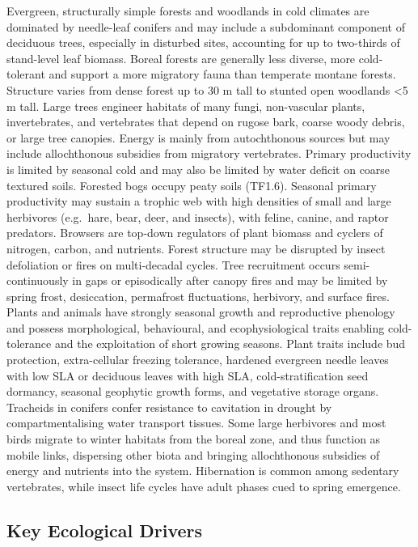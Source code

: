 \documentclass[
  letterpaper,
  DIV=11,
  numbers=noendperiod]{scrartcl}
\begin{document}
Evergreen, structurally simple forests and woodlands in cold climates
are dominated by needle-leaf conifers and may include a subdominant
component of deciduous trees, especially in disturbed sites, accounting
for up to two-thirds of stand-level leaf biomass. Boreal forests are
generally less diverse, more cold-tolerant and support a more migratory
fauna than temperate montane forests. Structure varies from dense forest
up to 30 m tall to stunted open woodlands \textless5 m tall. Large trees
engineer habitats of many fungi, non-vascular plants, invertebrates, and
vertebrates that depend on rugose bark, coarse woody debris, or large
tree canopies. Energy is mainly from autochthonous sources but may
include allochthonous subsidies from migratory vertebrates. Primary
productivity is limited by seasonal cold and may also be limited by
water deficit on coarse textured soils. Forested bogs occupy peaty soils
(TF1.6). Seasonal primary productivity may sustain a trophic web with
high densities of small and large herbivores (e.g.~hare, bear, deer, and
insects), with feline, canine, and raptor predators. Browsers are
top-down regulators of plant biomass and cyclers of nitrogen, carbon,
and nutrients. Forest structure may be disrupted by insect defoliation
or fires on multi-decadal cycles. Tree recruitment occurs
semi-continuously in gaps or episodically after canopy fires and may be
limited by spring frost, desiccation, permafrost fluctuations,
herbivory, and surface fires. Plants and animals have strongly seasonal
growth and reproductive phenology and possess morphological,
behavioural, and ecophysiological traits enabling cold-tolerance and the
exploitation of short growing seasons. Plant traits include bud
protection, extra-cellular freezing tolerance, hardened evergreen needle
leaves with low SLA or deciduous leaves with high SLA,
cold-stratification seed dormancy, seasonal geophytic growth forms, and
vegetative storage organs. Tracheids in conifers confer resistance to
cavitation in drought by compartmentalising water transport tissues.
Some large herbivores and most birds migrate to winter habitats from the
boreal zone, and thus function as mobile links, dispersing other biota
and bringing allochthonous subsidies of energy and nutrients into the
system. Hibernation is common among sedentary vertebrates, while insect
life cycles have adult phases cued to spring emergence.

\subsection{Key Ecological Drivers}\label{key-ecological-drivers-73}
\end{document}

